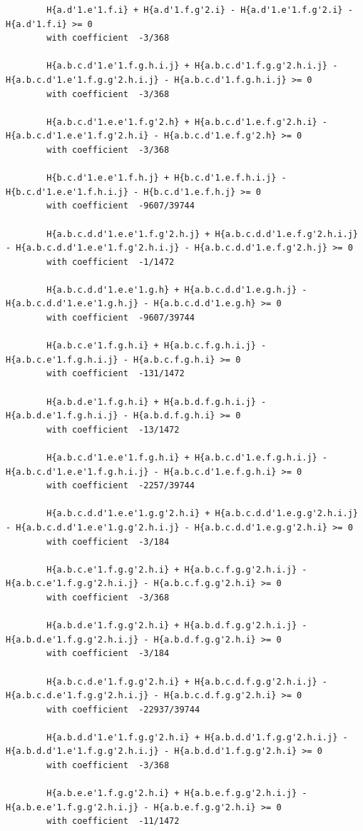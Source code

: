 \documentclass[11pt, a4paper]{kybernetika}
\begin{document}
\begin{verbatim}
		H{a.d'1.e'1.f.i} + H{a.d'1.f.g'2.i} - H{a.d'1.e'1.f.g'2.i} - H{a.d'1.f.i} >= 0
		with coefficient  -3/368
		
		H{a.b.c.d'1.e'1.f.g.h.i.j} + H{a.b.c.d'1.f.g.g'2.h.i.j} - H{a.b.c.d'1.e'1.f.g.g'2.h.i.j} - H{a.b.c.d'1.f.g.h.i.j} >= 0
		with coefficient  -3/368
		
		H{a.b.c.d'1.e.e'1.f.g'2.h} + H{a.b.c.d'1.e.f.g'2.h.i} - H{a.b.c.d'1.e.e'1.f.g'2.h.i} - H{a.b.c.d'1.e.f.g'2.h} >= 0
		with coefficient  -3/368
		
		H{b.c.d'1.e.e'1.f.h.j} + H{b.c.d'1.e.f.h.i.j} - H{b.c.d'1.e.e'1.f.h.i.j} - H{b.c.d'1.e.f.h.j} >= 0
		with coefficient  -9607/39744
		
		H{a.b.c.d.d'1.e.e'1.f.g'2.h.j} + H{a.b.c.d.d'1.e.f.g'2.h.i.j} - H{a.b.c.d.d'1.e.e'1.f.g'2.h.i.j} - H{a.b.c.d.d'1.e.f.g'2.h.j} >= 0
		with coefficient  -1/1472
		
		H{a.b.c.d.d'1.e.e'1.g.h} + H{a.b.c.d.d'1.e.g.h.j} - H{a.b.c.d.d'1.e.e'1.g.h.j} - H{a.b.c.d.d'1.e.g.h} >= 0
		with coefficient  -9607/39744
		
		H{a.b.c.e'1.f.g.h.i} + H{a.b.c.f.g.h.i.j} - H{a.b.c.e'1.f.g.h.i.j} - H{a.b.c.f.g.h.i} >= 0
		with coefficient  -131/1472
		
		H{a.b.d.e'1.f.g.h.i} + H{a.b.d.f.g.h.i.j} - H{a.b.d.e'1.f.g.h.i.j} - H{a.b.d.f.g.h.i} >= 0
		with coefficient  -13/1472
		
		H{a.b.c.d'1.e.e'1.f.g.h.i} + H{a.b.c.d'1.e.f.g.h.i.j} - H{a.b.c.d'1.e.e'1.f.g.h.i.j} - H{a.b.c.d'1.e.f.g.h.i} >= 0
		with coefficient  -2257/39744
		
		H{a.b.c.d.d'1.e.e'1.g.g'2.h.i} + H{a.b.c.d.d'1.e.g.g'2.h.i.j} - H{a.b.c.d.d'1.e.e'1.g.g'2.h.i.j} - H{a.b.c.d.d'1.e.g.g'2.h.i} >= 0
		with coefficient  -3/184
		
		H{a.b.c.e'1.f.g.g'2.h.i} + H{a.b.c.f.g.g'2.h.i.j} - H{a.b.c.e'1.f.g.g'2.h.i.j} - H{a.b.c.f.g.g'2.h.i} >= 0
		with coefficient  -3/368
		
		H{a.b.d.e'1.f.g.g'2.h.i} + H{a.b.d.f.g.g'2.h.i.j} - H{a.b.d.e'1.f.g.g'2.h.i.j} - H{a.b.d.f.g.g'2.h.i} >= 0
		with coefficient  -3/184
		
		H{a.b.c.d.e'1.f.g.g'2.h.i} + H{a.b.c.d.f.g.g'2.h.i.j} - H{a.b.c.d.e'1.f.g.g'2.h.i.j} - H{a.b.c.d.f.g.g'2.h.i} >= 0
		with coefficient  -22937/39744
		
		H{a.b.d.d'1.e'1.f.g.g'2.h.i} + H{a.b.d.d'1.f.g.g'2.h.i.j} - H{a.b.d.d'1.e'1.f.g.g'2.h.i.j} - H{a.b.d.d'1.f.g.g'2.h.i} >= 0
		with coefficient  -3/368
		
		H{a.b.e.e'1.f.g.g'2.h.i} + H{a.b.e.f.g.g'2.h.i.j} - H{a.b.e.e'1.f.g.g'2.h.i.j} - H{a.b.e.f.g.g'2.h.i} >= 0
		with coefficient  -11/1472
		

\end{verbatim}
\end{document}
